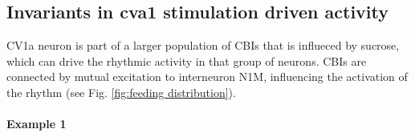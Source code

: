\subsection{Invariants in cva1 stimulation driven activity}
CV1a neuron is part of a larger population of CBIs that is influeced by sucrose, which can drive the rhythmic activity in that group of neurons. CBIs are connected by mutual excitation to interneuron N1M, influencing the activation of the rhythm (see Fig. \ref{fig:feeding distribution}). 
%
\paragraph{Example 1}

%

